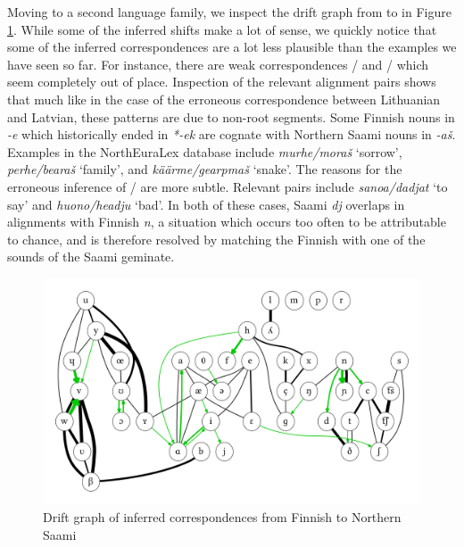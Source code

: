 Moving to a second language family, we inspect the drift graph from  to  in Figure \ref{fig:driftGraphFiSe}. While some of the inferred shifts make a lot of sense, we quickly notice that some of the inferred correspondences are a lot less plausible than the examples we have seen so far. For instance, there are weak correspondences \ipa{[E]}/\ipa{[S]} and \ipa{[n]}/\ipa{[c]} which seem completely out of place. Inspection of the relevant alignment pairs shows that much like in the case of the erroneous correspondence between Lithuanian and Latvian, these patterns are due to non-root segments. Some Finnish nouns in \textit{-e} which historically ended in \textit{*-ek} are cognate with Northern Saami nouns in \textit{-a\v{s}}. Examples in the NorthEuraLex database include \textit{murhe/mora\v{s}} `sorrow', \textit{perhe/beara\v{s}} `family', and \textit{k\"a\"arme/gearpma\v{s}} `snake'. The reasons for the erroneous inference of \ipa{[n]}/\ipa{[c]} are more subtle. Relevant pairs 
include \textit{sanoa/dadjat} `to say' and \textit{huono/headju} `bad'. In both of these cases, Saami \textit{dj} \ipa{[cc]} overlaps in alignments with Finnish \textit{n}, a situation which occurs too often to be attributable to chance, and is therefore resolved by matching the Finnish \ipa{[n]} with one of the \ipa{[c]} sounds of the Saami geminate.

\begin{figure}[h!]
    \includegraphics[width=\textwidth]{figures/drift-graph-fi-se.pdf}
    \caption{Drift graph of inferred correspondences from Finnish to Northern Saami}
    \label{fig:driftGraphFiSe}
\end{figure}

